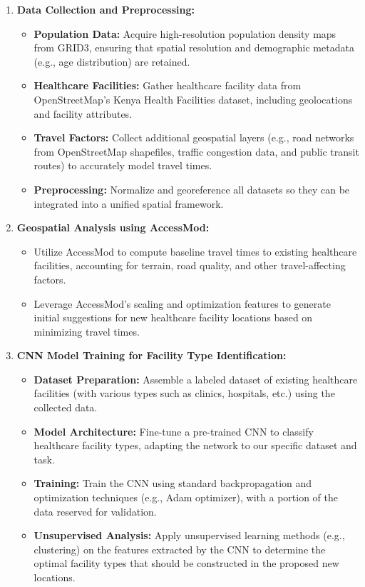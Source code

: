 \documentclass[11pt]{article}
\begin{document}
\begin{enumerate}
    \item \textbf{Data Collection and Preprocessing:}
    \begin{itemize}
        \item \textbf{Population Data:} Acquire high-resolution population density maps from GRID3, ensuring that spatial resolution and demographic metadata (e.g., age distribution) are retained.
        \item \textbf{Healthcare Facilities:} Gather healthcare facility data from OpenStreetMap’s Kenya Health Facilities dataset, including geolocations and facility attributes.
        \item \textbf{Travel Factors:} Collect additional geospatial layers (e.g., road networks from OpenStreetMap shapefiles, traffic congestion data, and public transit routes) to accurately model travel times.
        \item \textbf{Preprocessing:} Normalize and georeference all datasets so they can be integrated into a unified spatial framework.
    \end{itemize}

    \item \textbf{Geospatial Analysis using AccessMod:}
    \begin{itemize}
        \item Utilize AccessMod to compute baseline travel times to existing healthcare facilities, accounting for terrain, road quality, and other travel-affecting factors.
        \item Leverage AccessMod’s scaling and optimization features to generate initial suggestions for new healthcare facility locations based on minimizing travel times.
    \end{itemize}

    \item \textbf{CNN Model Training for Facility Type Identification:}
    \begin{itemize}
        \item \textbf{Dataset Preparation:} Assemble a labeled dataset of existing healthcare facilities (with various types such as clinics, hospitals, etc.) using the collected data.
        \item \textbf{Model Architecture:} Fine-tune a pre-trained CNN to classify healthcare facility types, adapting the network to our specific dataset and task.
        \item \textbf{Training:} Train the CNN using standard backpropagation and optimization techniques (e.g., Adam optimizer), with a portion of the data reserved for validation.
        \item \textbf{Unsupervised Analysis:} Apply unsupervised learning methods (e.g., clustering) on the features extracted by the CNN to determine the optimal facility types that should be constructed in the proposed new locations.
    \end{itemize}


\end{enumerate}
\end{document}
